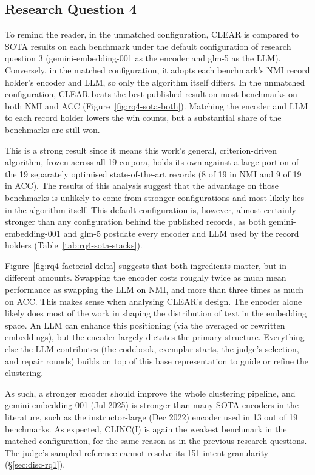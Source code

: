 \documentclass[11pt,a4paper,oneside]{report}
\begin{document}
\subsection{Research Question 4}

To remind the reader, in the unmatched configuration, CLEAR is compared to SOTA results on each benchmark under the default configuration of research question 3 ({\small\ttfamily gemini-embedding-001} as the encoder and {\small\ttfamily glm-5} as the LLM). Conversely, in the matched configuration, it adopts each benchmark's NMI record holder's encoder and LLM, so only the algorithm itself differs. In the unmatched configuration, CLEAR beats the best published result on most benchmarks on both NMI and ACC (Figure~\ref{fig:rq4-sota-both}). Matching the encoder and LLM to each record holder lowers the win counts, but a substantial share of the benchmarks are still won.

This is a strong result since it means this work's general, criterion-driven algorithm, frozen across all 19 corpora, holds its own against a large portion of the 19 separately optimised state-of-the-art records (8 of 19 in NMI and 9 of 19 in ACC). The results of this analysis suggest that the advantage on those benchmarks is unlikely to come from stronger configurations and most likely lies in the algorithm itself. This default configuration is, however, almost certainly
stronger than any configuration behind the published records, as both
{\small\ttfamily gemini-embedding-001} and {\small\ttfamily glm-5}
postdate every encoder and LLM used by the record holders
(Table~\ref{tab:rq4-sota-stacks}).

Figure~\ref{fig:rq4-factorial-delta} suggests that both ingredients matter, but in different amounts. Swapping the encoder costs roughly twice as much mean performance as swapping the LLM on NMI, and more than three times as much on ACC. This makes sense when analysing CLEAR's design. The encoder alone likely does most of the work in shaping the distribution of text in the embedding space. An LLM can enhance this positioning (via the averaged or rewritten embeddings), but the encoder largely dictates the primary structure. Everything else the LLM contributes (the codebook, exemplar starts, the judge's selection, and repair rounds) builds on top of this base representation to guide or refine the clustering.

As such, a stronger encoder should improve the whole clustering pipeline, and {\small\ttfamily gemini-embedding-001} (Jul 2025) is stronger than many SOTA encoders in the literature, such as the {\small\ttfamily instructor-large} (Dec 2022) encoder used in 13 out of 19 benchmarks. As expected, CLINC(I) is again the weakest benchmark in the matched configuration, for the same reason as in the previous research questions. The judge's sampled reference cannot resolve its 151-intent granularity (\S\ref{sec:disc-rq1}).
\end{document}
